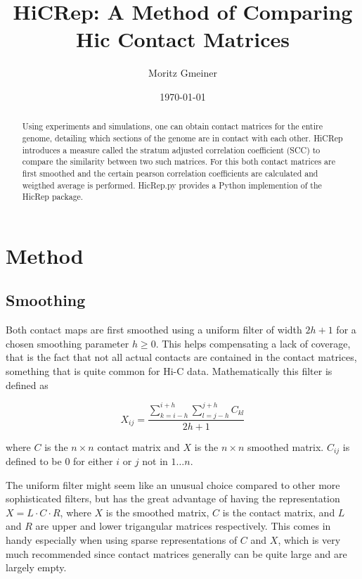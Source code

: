 \documentclass[10pt,abstract=true,titlepage=false,toc=bib]{scrartcl}
\title{HiCRep: A Method of Comparing Hic Contact Matrices}
\author{Moritz Gmeiner}
\date{\today}
\begin{document}
\maketitle

\begin{abstract}

Using experiments and simulations, one can obtain contact matrices for the entire genome, detailing which sections of the genome are in contact with each other. HiCRep\cite{yang_hicrep_2017} introduces a measure called the stratum adjusted correlation coefficient (SCC) to compare the similarity between two such matrices. For this both contact matrices are first smoothed and the certain pearson correlation coefficients are calculated and weigthed average is performed. HicRep.py\cite{lin_hicreppy_2021} provides a Python implemention of the HicRep package.

\end{abstract}

\section{Method} %
\label{sec:method}

\subsection{Smoothing} %
\label{subsec:smoothing}

Both contact maps are first smoothed using a uniform filter of width \(2h+1\) for a chosen smoothing parameter \(h \geq 0\). This helps compensating a lack of coverage, that is the fact that not all actual contacts are contained in the contact matrices, something that is quite common for Hi-C data. Mathematically this filter is defined as

\[
	X_{ij} = \frac{ \sum_{k=i-h}^{i+h} \sum_{l=j-h}^{j+h} C_{kl} }{ 2h+1 }
\]

where \(C\) is the \(n \times n\) contact matrix and \(X\) is the \(n \times n\) smoothed matrix. \(C_{ij}\) is defined to be 0 for either \(i\) or \(j\) not in \(1 \dots n\).

The uniform filter might seem like an unusual choice compared to other more sophisticated filters, but has the great advantage of having the representation \( X = L \cdot C \cdot R \), where \(X\) is the smoothed matrix, \(C\) is the contact matrix, and \(L\) and \(R\) are upper and lower trigangular matrices respectively. This comes in handy especially when using sparse representations of \(C\) and \(X\), which is very much recommended since contact matrices generally can be quite large and are largely empty.
\end{document}
